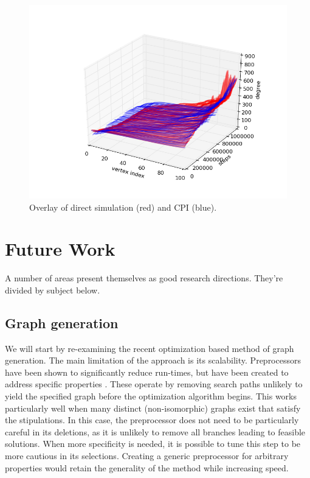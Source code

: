 \documentclass[11pt]{article}
\begin{document}
\begin{figure}[h!]
  \centering
  \includegraphics[width=0.6\linewidth]{paCPI}
  \caption{Overlay of direct simulation (red) and CPI (blue).}
  \label{fig:paCPI}
\end{figure}
\section{Future Work}
\label{sec:FW}
A number of areas present themselves as good research directions. They're divided by subject below.
\subsection{Graph generation}
\indent We will start by re-examining the recent optimization based method of graph generation. The main limitation of the approach is its scalability. Preprocessors have been shown to significantly reduce run-times, but have been created to address specific properties \cite{Gounaris2011}. These operate by removing search paths unlikely to yield the specified graph before the optimization algorithm begins. This works particularly well when many distinct (non-isomorphic) graphs exist that satisfy the stipulations. In this case, the preprocessor does not need to be particularly careful in its deletions, as it is unlikely to remove all branches leading to feasible solutions. When more specificity is needed, it is possible to tune this step to be more cautious in its selections. Creating a generic preprocessor for arbitrary properties would retain the generality of the method while increasing speed. \\
\end{document}
